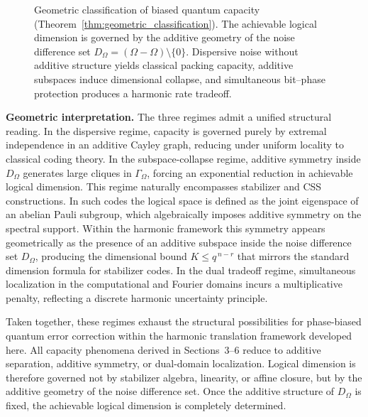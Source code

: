 \documentclass[a4paper,twocolumn,11pt,allowtoday]{quantumarticle}
\theoremstyle{plain}
\theoremstyle{definition}
\theoremstyle{remark}
\begin{document}
\begin{figure}[t]
\caption{Geometric classification of biased quantum capacity (Theorem~\ref{thm:geometric_classification}). The achievable logical dimension is governed by the additive geometry of the noise difference set $D_\Omega=(\Omega-\Omega)\setminus\{0\}$. Dispersive noise without additive structure yields classical packing capacity, additive subspaces induce dimensional collapse, and simultaneous bit--phase protection produces a harmonic rate tradeoff.}
\label{fig:geometric_classification}
\end{figure}




\noindent\textbf{Geometric interpretation.} The three regimes admit a unified structural reading. In the dispersive regime, capacity is governed purely by extremal independence in an additive Cayley graph, reducing under uniform locality to classical coding theory. In the subspace-collapse regime, additive symmetry inside $D_\Omega$ generates large cliques in $\Gamma_\Omega$, forcing an exponential reduction in achievable logical dimension. This regime naturally encompasses stabilizer and CSS constructions. In such codes the logical space is defined as the joint eigenspace of an abelian Pauli subgroup, which algebraically imposes additive symmetry on the spectral support. Within the harmonic framework this symmetry appears geometrically as the presence of an additive subspace inside the noise difference set $D_\Omega$, producing the dimensional bound $K \le q^{\,n-r}$ that mirrors the standard dimension formula for stabilizer codes. In the dual tradeoff regime, simultaneous localization in the computational and Fourier domains incurs a multiplicative penalty, reflecting a discrete harmonic uncertainty principle.

\medskip
\noindent Taken together, these regimes exhaust the structural possibilities for phase-biased quantum error correction within the harmonic translation framework developed here. All capacity phenomena derived in Sections~3--6 reduce to additive separation, additive symmetry, or dual-domain localization. Logical dimension is therefore governed not by stabilizer algebra, linearity, or affine closure, but by the additive geometry of the noise difference set. Once the additive structure of $D_\Omega$ is fixed, the achievable logical dimension is completely determined.
\end{document}
